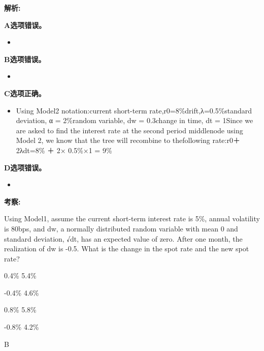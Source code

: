 \documentclass{article}
\newcounter{question} %
\newenvironment{explanation}
{\textbf{解析:}\par}
{\par}
\newcommand{\checklist}[1]{
    \textbf{考察:} #1 \par %
    \addcontentsline{toc}{subsection}{题号\thequestion 考察: #1} %
    \vspace{2em} %
}
\begin{document}
\begin{explanation}
    \textbf{A选项错误。}
    \begin{itemize}
        \item 
    \end{itemize}
    \textbf{B选项错误。}
    \begin{itemize}
        \item 
    \end{itemize}
    \textbf{C选项正确。}
    \begin{itemize}
        \item Using Model2 notation:current short-term rate,r0=8\%drift,λ=0.5\%standard deviation,
        α = 2\%random variable, dw = 0.3change in time, dt = 1Since we are asked to find the interest
        rate at the second period middlenode using Model 2, we know that the tree will recombine to
        thefollowing rate:r0＋2λdt=8\% ＋ 2× 0.5\%×1 = 9\%
    \end{itemize}
    \textbf{D选项错误。}
    \begin{itemize}
        \item 
    \end{itemize}
\end{explanation}
\checklist{}




\begin{question}
    Using Model1, assume the current short-term interest rate is 5\%, annual volatility is 80bps,
    and dw, a normally distributed random variable with mean 0 and standard deviation, √dt, has an
    expected value of zero. After one month, the realization of dw is -0.5. What is the change in
    the spot rate and the new spot rate?
\end{question}

\begin{choices}
    \item 0.4\% 5.4\%
    \item -0.4\% 4.6\%
    \item 0.8\% 5.8\%
    \item -0.8\% 4.2\%
\end{choices}

\begin{correctanswer}
    B
\end{correctanswer}
\end{document}
